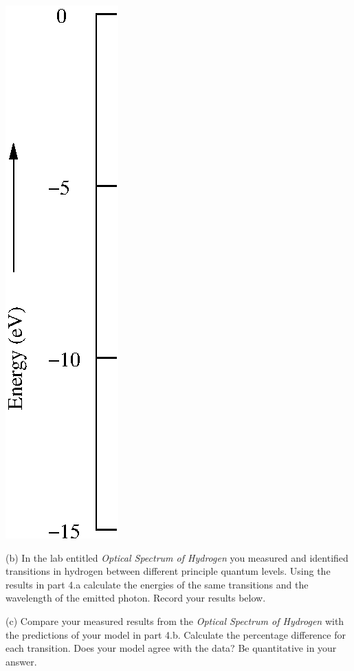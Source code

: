 \hspace{1.0cm}\includegraphics{solveSE/energyLevels.eps}

\vspace{0.75in}

\newpage

(b) In the lab entitled {\it Optical Spectrum of Hydrogen}
you measured and identified transitions in hydrogen between different
principle quantum levels.
Using the results in part 4.a calculate the energies of the 
same transitions and the wavelength of the emitted photon.
Record your results below.
\vspace{4.0cm}

(c) Compare your measured results from the {\it Optical Spectrum of Hydrogen}
with the predictions of your model in part 4.b.
Calculate the percentage difference for each transition.
Does your model agree with the data?
Be quantitative in your answer.
\vspace{3.0cm}


